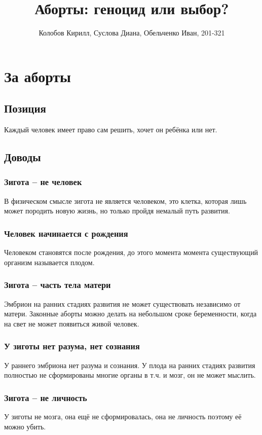 \documentclass[a4paper,12pt]{report}
\author{Колобов Кирилл, Суслова Диана, Обельченко Иван, 201-321}
\date{}
\title{Аборты: геноцид или выбор?}
\begin{document}
\maketitle
\tableofcontents

\part{За аборты}
\chapter{Позиция}
    Каждый человек имеет право сам решить, хочет он ребёнка или нет.
\chapter{Доводы}
    \section{Зигота -- не человек}
        В физическом смысле зигота не является человеком, это клетка, 
        которая лишь может породить новую жизнь, но только пройдя 
        немалый путь развития.
    \section{Человек начинается с рождения}
        Человеком становятся после рождения, до этого момента момента
        существующий организм называется плодом.
    \section{Зигота -- часть тела матери}
        Эмбрион на ранних стадиях развития не может существовать
        независимо от матери. Законные аборты можно делать на небольшом
        сроке беременности, когда на свет не может появиться живой человек.
    \section{У зиготы нет разума, нет сознания}
        У раннего эмбриона нет разума и сознания.
        У плода на ранних стадиях развития полностью не сформированы многие 
        органы в т.ч. и мозг, он не может мыслить.
    \section{Зигота -- не личность}
        У зиготы не мозга, она ещё не сформировалась, она не 
        личность поэтому её можно убить.
\end{document}
